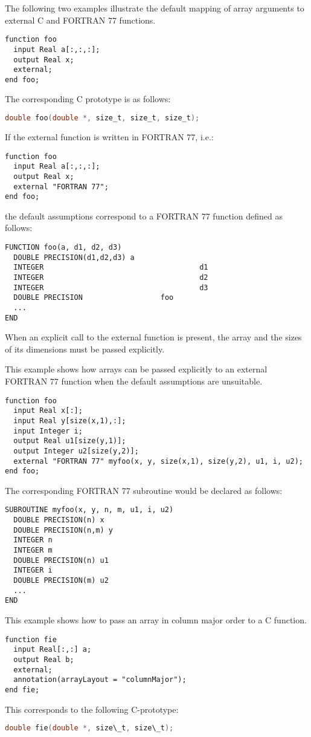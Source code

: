 \begin{example}
The following two examples illustrate the default mapping of
array arguments to external C and FORTRAN 77 functions.

\begin{lstlisting}[language=modelica]
function foo
  input Real a[:,:,:];
  output Real x;
  external;
end foo;
\end{lstlisting}
The corresponding C prototype is as follows:
\begin{lstlisting}[language=C]
double foo(double *, size_t, size_t, size_t);
\end{lstlisting}

If the external function is written in FORTRAN 77, i.e.:
\begin{lstlisting}[language=modelica]
function foo
  input Real a[:,:,:];
  output Real x;
  external "FORTRAN 77";
end foo;
\end{lstlisting}
the default assumptions correspond to a FORTRAN 77 function
defined as follows:
\begin{lstlisting}[language=fortran77]
FUNCTION foo(a, d1, d2, d3)
  DOUBLE PRECISION(d1,d2,d3) a
  INTEGER                                    d1
  INTEGER                                    d2
  INTEGER                                    d3
  DOUBLE PRECISION                  foo
  ...
END
\end{lstlisting}
\end{example}

When an explicit call to the external function is present, the array and
the sizes of its dimensions must be passed explicitly.

\begin{example}
This example shows how arrays can be passed explicitly to an
external FORTRAN 77 function when the default assumptions are
unsuitable.

\begin{lstlisting}[language=modelica]
function foo
  input Real x[:];
  input Real y[size(x,1),:];
  input Integer i;
  output Real u1[size(y,1)];
  output Integer u2[size(y,2)];
  external "FORTRAN 77" myfoo(x, y, size(x,1), size(y,2), u1, i, u2);
end foo;
\end{lstlisting}
The corresponding FORTRAN 77 subroutine would be declared as follows:
\begin{lstlisting}[language=fortran77]
SUBROUTINE myfoo(x, y, n, m, u1, i, u2)
  DOUBLE PRECISION(n) x
  DOUBLE PRECISION(n,m) y
  INTEGER n
  INTEGER m
  DOUBLE PRECISION(n) u1
  INTEGER i
  DOUBLE PRECISION(m) u2
  ...
END
\end{lstlisting}

This example shows how to pass an array in column major order to a C function.

\begin{lstlisting}[language=modelica]
function fie
  input Real[:,:] a;
  output Real b;
  external;
  annotation(arrayLayout = "columnMajor");
end fie;
\end{lstlisting}
This corresponds to the following C-prototype:
\begin{lstlisting}[language=C]
double fie(double *, size\_t, size\_t);
\end{lstlisting}
\end{example}


